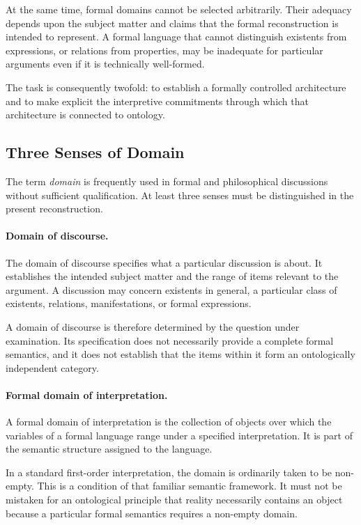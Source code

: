 At the same time, formal domains cannot be selected
arbitrarily. Their adequacy depends upon the subject
matter and claims that the formal reconstruction is
intended to represent. A formal language that cannot
distinguish existents from expressions, or relations
from properties, may be inadequate for particular
arguments even if it is technically well-formed.

The task is consequently twofold: to establish a
formally controlled architecture and to make explicit
the interpretive commitments through which that
architecture is connected to ontology.

\subsection{Three Senses of Domain}

The term \emph{domain} is frequently used in formal
and philosophical discussions without sufficient
qualification. At least three senses must be
distinguished in the present reconstruction.

\paragraph{Domain of discourse.}

The domain of discourse specifies what a particular
discussion is about. It establishes the intended
subject matter and the range of items relevant to
the argument. A discussion may concern existents
in general, a particular class of existents, relations,
manifestations, or formal expressions.

A domain of discourse is therefore determined by
the question under examination. Its specification
does not necessarily provide a complete formal
semantics, and it does not establish that the
items within it form an ontologically independent
category.

\paragraph{Formal domain of interpretation.}

A formal domain of interpretation is the collection
of objects over which the variables of a formal
language range under a specified interpretation.
It is part of the semantic structure assigned to
the language.

In a standard first-order interpretation, the
domain is ordinarily taken to be non-empty. This
is a condition of that familiar semantic framework.
It must not be mistaken for an ontological
principle that reality necessarily contains an
object because a particular formal semantics
requires a non-empty domain.

